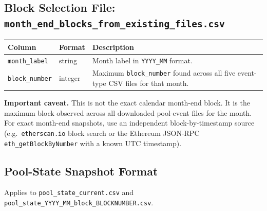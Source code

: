 \documentclass[11pt,a4paper]{article}
\begin{document}
\subsection{Block Selection File: \texttt{month\_end\_blocks\_from\_existing\_files.csv}}

\begin{xltabular}{\linewidth}{L{4.2cm}L{3.0cm}Y}
\toprule
\textbf{Column} & \textbf{Format} & \textbf{Description} \\
\midrule
\texttt{month\_label} & string & Month label in \texttt{YYYY\_MM} format. \\
\texttt{block\_number} & integer & Maximum \texttt{block\_number} found
  across all five event-type CSV files for that month. \\
\bottomrule
\end{xltabular}

\noindent\textbf{Important caveat.} This is not the exact calendar
month-end block. It is the maximum block observed across all downloaded
pool-event files for the month. For exact month-end snapshots, use an
independent block-by-timestamp source (e.g.\ \texttt{etherscan.io} block
search or the Ethereum JSON-RPC \texttt{eth\_getBlockByNumber} with a
known UTC timestamp).

\subsection{Pool-State Snapshot Format}

Applies to \texttt{pool\_state\_current.csv} and
\texttt{pool\_state\_YYYY\_MM\_block\_BLOCKNUMBER.csv}.
\end{document}

